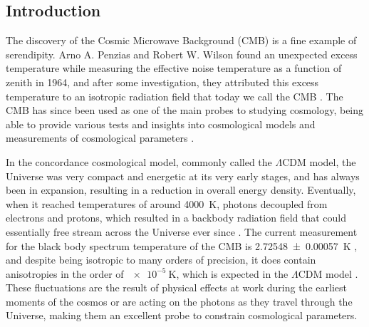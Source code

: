 \documentclass[openany,a4paper,12pt,oneside]{book}
\begin{document}
\listoffigures


\listoftables

\tableofcontents

\cleardoublepage
{}

\begingroup
{}
\begin{spacing}{1.5}
\setlength{\abovedisplayskip}{0.01cm}
\setlength{\abovedisplayshortskip}{0.01cm}

\chapter{Introduction}

The discovery of the Cosmic Microwave Background (CMB) is a fine example of serendipity. Arno A. Penzias and Robert W. Wilson found an unexpected excess temperature while measuring the effective noise temperature as a function of zenith in 1964, and after some investigation, they attributed this excess temperature to an isotropic radiation field that today we call the CMB \cite{1965CMB_discovery}. The CMB has since been used as one of the main probes to studying cosmology, being able to provide various tests and insights into cosmological models \cite{Large_scale_anomalies, nongaussianity_inflation, rees_sciama_effect} and measurements of cosmological parameters \cite{WMAP_results, Planck_results}. 

In the concordance cosmological model, commonly called the $\Lambda$CDM model, the Universe was very compact and energetic at its very early stages, and has always been in expansion, resulting in a reduction in overall energy density. Eventually, when it reached temperatures of around \SI{4000}{\kelvin}, photons decoupled from electrons and protons, which resulted in a backbody radiation field that could essentially free stream across the Universe ever since \cite{CMB_physical_explanation}. The current measurement for the black body spectrum temperature of the CMB is \SI{2.72548 \pm 0.00057}{\kelvin} \cite{CMB_temperature:Fixsen_2009}, and despite being isotropic to many orders of precision, it does contain anisotropies in the order of $\SI{e-5}{\kelvin}$, which is expected in the $\Lambda$CDM model \cite{CMB_analytical_anisotropies}. These fluctuations are the result of physical effects at work during the earliest moments of the cosmos or are acting on the photons as they travel through the Universe, making them an excellent probe to constrain cosmological parameters.


\end{spacing}
\end{document}
